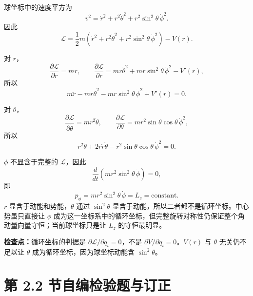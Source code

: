 \begin{checkedsolution}
球坐标中的速度平方为
\[
  v^2=\dot r^2+r^2\dot\theta^2
  +r^2\sin^2\theta\,\dot\phi^2.
\]
因此
\begin{equation}
  \mathcal L
  =\frac12m\left(
    \dot r^2+r^2\dot\theta^2
    +r^2\sin^2\theta\,\dot\phi^2
  \right)-V(r).
  \label{eq:QM-C02-S01-E03-lagrangian}
\end{equation}

对 $r$，
\[
  \frac{\partial\mathcal L}{\partial\dot r}=m\dot r,
  \qquad
  \frac{\partial\mathcal L}{\partial r}
  =mr\dot\theta^2+mr\sin^2\theta\,\dot\phi^2-V'(r),
\]
所以
\begin{equation}
  \boxed{
  m\ddot r-mr\dot\theta^2
  -mr\sin^2\theta\,\dot\phi^2+V'(r)=0.}
  \label{eq:QM-C02-S01-E03-radial}
\end{equation}

对 $\theta$，
\[
  \frac{\partial\mathcal L}{\partial\dot\theta}=mr^2\dot\theta,
  \qquad
  \frac{\partial\mathcal L}{\partial\theta}
  =mr^2\sin\theta\cos\theta\,\dot\phi^2,
\]
所以
\begin{equation}
  \boxed{
  r^2\ddot\theta+2r\dot r\dot\theta
  -r^2\sin\theta\cos\theta\,\dot\phi^2=0.}
  \label{eq:QM-C02-S01-E03-theta}
\end{equation}

$\phi$ 不显含于完整的 $\mathcal L$，因此
\begin{equation}
  \boxed{
  \frac{d}{dt}\left(
    mr^2\sin^2\theta\,\dot\phi
  \right)=0,}
  \label{eq:QM-C02-S01-E03-phi}
\end{equation}
即
\begin{equation}
  \boxed{
  p_\phi=mr^2\sin^2\theta\,\dot\phi=L_z
  =\text{constant}.}
  \label{eq:QM-C02-S01-E03-lz}
\end{equation}
$r$ 显含于动能和势能，$\theta$ 通过 $\sin^2\theta$ 显含于动能，所以二者都不是循环坐标。中心势虽只直接让 $\phi$ 成为这一坐标系中的循环坐标，但完整旋转对称性仍保证整个角动量向量守恒；当前球坐标只是让 $L_z$ 的守恒最明显。
\end{checkedsolution}

\textbf{检查点：}循环坐标的判据是 $\partial\mathcal L/\partial q_i=0$，不是 $\partial V/\partial q_i=0$。$V(r)$ 与 $\theta$ 无关仍不足以让 $\theta$ 成为循环坐标，因为球坐标动能含 $\sin^2\theta$。

\section{第 2.2 节自编检验题与订正}
\label{exercise-set:QM-C02-S02}

